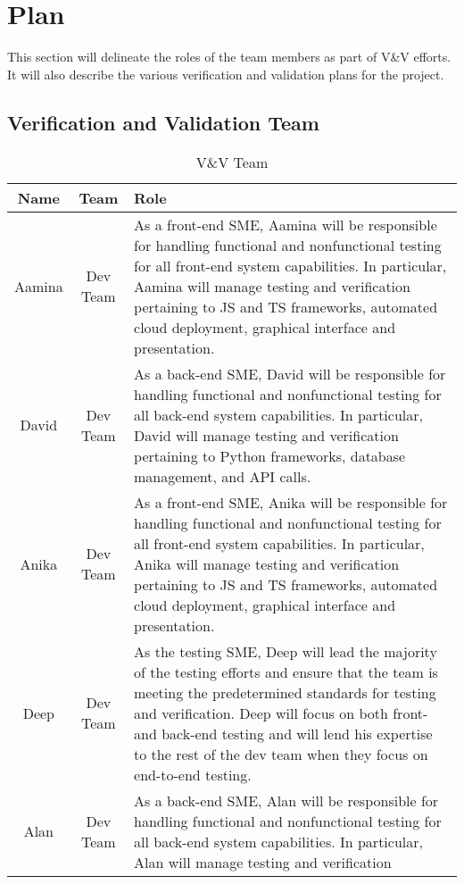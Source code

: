 \documentclass[12pt, titlepage]{article}
\begin{document}
\section{Plan}
This section will delineate the roles of the team members as part of V\&V efforts. 
It will also describe the various verification and validation plans for the project. 
\subsection{Verification and Validation Team}
\begin{table}[H]
    \caption{ V\&V Team}
    \begin{tabular}{|c|c|p{10cm}|}
        \hline
        \textbf{Name} & \textbf{Team} & \textbf{Role} \\
        \hline 
        Aamina & Dev Team & As a front-end SME, Aamina will be responsible for handling functional and 
        nonfunctional testing for all front-end system capabilities. In particular, Aamina will manage 
        testing and verification pertaining to JS and TS frameworks, automated cloud deployment, graphical interface and presentation.\\
        \hline 
        David & Dev Team & As a back-end SME, David will be responsible for handling functional and nonfunctional testing 
        for all back-end system capabilities. In particular, David will manage testing and verification 
        pertaining to Python frameworks, database management, and API calls. \\
        \hline
        Anika & Dev Team & As a front-end SME, Anika will be responsible for handling functional and 
        nonfunctional testing for all front-end system capabilities. In particular, Anika will manage 
        testing and verification pertaining to JS and TS frameworks, automated cloud deployment, graphical interface and presentation.\\
        \hline
        Deep & Dev Team & As the testing SME, Deep will lead the majority of the testing efforts and ensure that the team is meeting
        the predetermined standards for testing and verification. Deep will focus on both
        front- and back-end testing and will lend his expertise to the rest of the dev team when they focus on end-to-end testing. \\
        \hline
        Alan & Dev Team & As a back-end SME, Alan will be responsible for handling functional and nonfunctional testing 
        for all back-end system capabilities. In particular, Alan will manage testing and verification 

\end{tabular}
\end{table}
\end{document}
